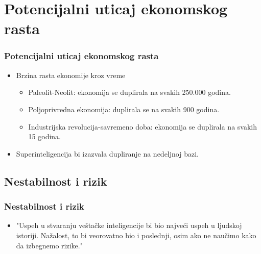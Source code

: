 \documentclass{beamer}
\begin{document}
\section{Potencijalni uticaj ekonomskog rasta}
\begin{frame}[fragile]\frametitle{Potencijalni uticaj ekonomskog rasta}
	\begin{itemize}	
		\item Brzina rasta ekonomije kroz vreme
            \begin{itemize}
                \item Paleolit-Neolit: ekonomija se duplirala na svakih 250.000 godina.
                \item Poljoprivredna ekonomija: duplirala se na svakih 900 godina.
                \item Industrijska revolucija-savremeno doba: ekonomija se duplirala na svakih 15 godina.
            \end{itemize}   
            \item Superinteligencija bi izazvala dupliranje na nedeljnoj bazi.
	\end{itemize}
\end{frame}

\subsection{Nestabilnost i rizik}
\begin{frame}[fragile]\frametitle{Nestabilnost i rizik}
	\begin{itemize}	
            \item "Uspeh u stvaranju veštačke inteligencije bi bio najveći uspeh u ljudskoj istoriji. Nažalost, to bi veorovatno bio i poslednji, osim ako ne naučimo kako da izbegnemo rizike."

	\end{itemize}
\end{frame}
\end{document}
